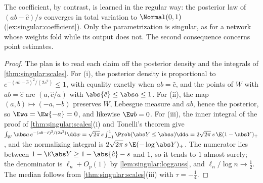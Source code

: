 \begin{refsection}
The coefficient, by contrast, is learned in the regular way: the posterior law of $(ab-\hat c)/s$ converges in total variation to $\Normal(0,1)$ (\cref{ex:singular:coefficient}). Only the parametrization is singular, as for a network whose weights fold while its output does not. The second consequence concerns point estimates.


\begin{proof}
The plan is to read each claim off the posterior density and the integrals of \cref{thm:singular:scales}. For (i), the posterior density is proportional to $e^{-(ab-\hat c)^2/(2s^2)}\le1$, with equality exactly when $ab=\hat c$, and the points of $W$ with $ab=\hat c$ are $(a,\hat c/a)$ with $\abs{\hat c}\le\abs a\le1$. For (ii), the map $(a,b)\mapsto(-a,-b)$ preserves $W$, Lebesgue measure and $ab$, hence the posterior, so $\Ew a=\Ew{-a}=0$, and likewise $\Ew b=0$. For (iii), the inner integral of the proof of \cref{thm:singular:scales}(i) and Tonelli's theorem give $\int_W\abs a\,e^{-(ab-\hat c)^2/(2s^2)}\dd w=\sqrt{2\pi}\,s\int_{-1}^1\Prob(\abs Y\le\abs a)\dd a=2\sqrt{2\pi}\,s\,\E(1-\abs Y)_+$, and the normalizing integral is $2\sqrt{2\pi}\,s\,\E(-\log\abs Y)_+$. The numerator lies between $1-\E\abs Y\ge1-\abs{\hat c}-s$ and $1$, so it tends to $1$ almost surely; the denominator is $\ell_n+O_p(1)$ by \cref{lem:singular:loggauss}, and $\ell_n/\log n\to\frac12$. The median follows from \cref{thm:singular:scales}(iii) with $\tau=-\frac14$.
\end{proof}


\end{refsection}
